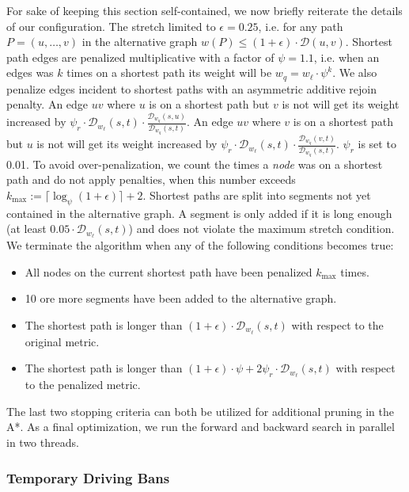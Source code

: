 \documentclass[manuscript,review]{acmart}
\newcommand*{\dist}{\mathcal{D}}
\begin{document}
For sake of keeping this section self-contained, we now briefly reiterate the details of our configuration.
The stretch limited to $\epsilon = 0.25$, i.e. for any path $P = (u,\dots,v)$ in the alternative graph $w(P) \leq (1+\epsilon) \cdot \dist(u,v)$.
Shortest path edges are penalized multiplicative with a factor of $\psi = 1.1$, i.e. when an edges was $k$ times on a shortest path its weight will be $w_q = w_{\ell}\cdot\psi^k$.
We also penalize edges incident to shortest paths with an asymmetric additive rejoin penalty.
An edge $uv$ where $u$ is on a shortest path but $v$ is not will get its weight increased by $\psi_r \cdot \dist_{w_{\ell}}(s,t) \cdot \frac{\dist_{w_q}(s,u)}{\dist_{w_q}(s,t)}$.
An edge $uv$ where $v$ is on a shortest path but $u$ is not will get its weight increased by $\psi_r \cdot \dist_{w_{\ell}}(s,t) \cdot \frac{\dist_{w_q}(v,t)}{\dist_{w_q}(s,t)}$.
$\psi_r$ is set to 0.01.
To avoid over-penalization, we count the times a \emph{node} was on a shortest path and do not apply penalties, when this number exceeds $k_{\max} := \lceil\log_{\psi}(1+\epsilon)\rceil + 2$.
Shortest paths are split into segments not yet contained in the alternative graph.
A segment is only added if it is long enough (at least $0.05 \cdot \dist_{w_{\ell}}(s,t)$) and does not violate the maximum stretch condition.
We terminate the algorithm when any of the following conditions becomes true:
\begin{itemize}
	\item All nodes on the current shortest path have been penalized $k_{\max}$ times.
	\item 10 ore more segments have been added to the alternative graph.
	\item The shortest path is longer than $(1+\epsilon) \cdot \dist_{w_{\ell}}(s,t)$ with respect to the original metric.
	\item The shortest path is longer than $(1+\epsilon) \cdot \psi + 2\psi_r \cdot \dist_{w_{\ell}}(s,t)$ with respect to the penalized metric.
\end{itemize}
The last two stopping criteria can both be utilized for additional pruning in the A*.
As a final optimization, we run the forward and backward search in parallel in two threads.

\subsubsection{Temporary Driving Bans}
\end{document}

